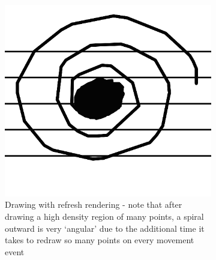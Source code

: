 \begin{figure}[hbt                                   ]
    \centering

    \begin{subfigure}[b]{.49\linewidth}
        \centering
      \includegraphics[width=\linewidth]{gfx/implementation/lag-stave.png}
      \caption{Drawing with refresh rendering - note that after drawing a high density region of many points, a spiral outward is very `angular' due to the additional time it takes to redraw so many points on every movement event }
      \label{fig:drawing-lag-rough}
    \end{subfigure}
    \begin{subfigure}[b]{.49\linewidth}
        \centering

\end{subfigure}
\end{figure}
